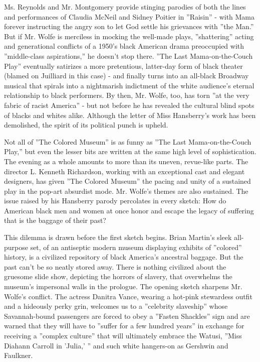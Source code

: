 Ms. Reynolds and Mr. Montgomery provide stinging parodies of both the
lines and performances of Claudia McNeil and Sidney Poitier in
''Raisin'' - with Mama forever instructing the angry son to let God
settle his grievances with ''the Man.'' But if Mr. Wolfe is merciless in
mocking the well-made plays, ''shattering'' acting and generational
conflicts of a 1950's black American drama preoccupied with
''middle-class aspirations,'' he doesn't stop there. ''The Last
Mama-on-the-Couch Play'' eventually satirizes a more pretentious,
latter-day form of black theater (blamed on Juilliard in this case) -
and finally turns into an all-black Broadway musical that spirals into a
nightmarish indictment of the white audience's eternal relationship to
black performers. By then, Mr. Wolfe, too, has torn ''at the very fabric
of racist America'' - but not before he has revealed the cultural blind
spots of blacks and whites alike. Although the letter of Miss
Hansberry's work has been demolished, the spirit of its political punch
is upheld.

Not all of ''The Colored Museum'' is as funny as ''The Last
Mama-on-the-Couch Play,'' but even the lesser bits are written at the
same high level of sophistication. The evening as a whole amounts to
more than its uneven, revue-like parts. The director L. Kenneth
Richardson, working with an exceptional cast and elegant designers, has
given ''The Colored Museum'' the pacing and unity of a sustained play in
the pop-art absurdist mode. Mr. Wolfe's themes are also sustained. The
issue raised by his Hansberry parody percolates in every sketch: How do
American black men and women at once honor and escape the legacy of
suffering that is the baggage of their past?

This dilemma is drawn before the first sketch begins. Brian Martin's
sleek all-purpose set, of an antiseptic modern museum displaying
exhibits of ''colored'' history, is a civilized repository of black
America's ancestral baggage. But the past can't be so neatly stored
away. There is nothing civilized about the gruesome slide show,
depicting the horrors of slavery, that overwhelms the museum's
impersonal walls in the prologue. The opening sketch sharpens Mr.
Wolfe's conflict. The actress Danitra Vance, wearing a hot-pink
stewardess outfit and a hideously perky grin, welcomes us to a
''celebrity slaveship'' whose Savannah-bound passengers are forced to
obey a ''Fasten Shackles'' sign and are warned that they will have to
''suffer for a few hundred years'' in exchange for receiving a ''complex
culture'' that will ultimately embrace the Watusi, ''Miss Diahann
Carroll in 'Julia,' '' and such white hangers-on as Gershwin and
Faulkner.

